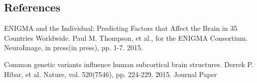 \documentclass[twocolumn]{bmcart}%
\begin{document}
\begin{backmatter}

\section{References}\label{references}
ENIGMA and the Individual: Predicting Factors that Affect the Brain in 35 Countries Worldwide. Paul M. Thompson, et al., for the ENIGMA Consortium. NeuroImage, in press(in press), pp. 1-7. 2015.

Common genetic variants influence human subcortical brain structures. Derrek P. Hibar, et al. Nature, vol. 520(7546), pp. 224-229. 2015. Journal Paper


\end{backmatter}
\end{document}

